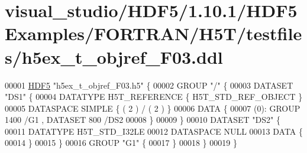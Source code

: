 \hypertarget{visual__studio_2_h_d_f5_21_810_81_2_h_d_f5_examples_2_f_o_r_t_r_a_n_2_h5_t_2testfiles_2h5ex__t__objref___f03_8ddl_source}{}\section{visual\+\_\+studio/\+H\+D\+F5/1.10.1/\+H\+D\+F5\+Examples/\+F\+O\+R\+T\+R\+A\+N/\+H5\+T/testfiles/h5ex\+\_\+t\+\_\+objref\+\_\+\+F03.ddl}
\label{visual__studio_2_h_d_f5_21_810_81_2_h_d_f5_examples_2_f_o_r_t_r_a_n_2_h5_t_2testfiles_2h5ex__t__objref___f03_8ddl_source}

\begin{DoxyCode}
00001 \hyperlink{namespace_h_d_f5}{HDF5} \textcolor{stringliteral}{"h5ex\_t\_objref\_F03.h5"} \{
00002 GROUP \textcolor{stringliteral}{"/"} \{
00003    DATASET \textcolor{stringliteral}{"DS1"} \{
00004       DATATYPE  H5T\_REFERENCE \{ H5T\_STD\_REF\_OBJECT \}
00005       DATASPACE  SIMPLE \{ ( 2 ) / ( 2 ) \}
00006       DATA \{
00007       (0): GROUP 1400 /G1 , DATASET 800 /DS2 
00008       \}
00009    \}
00010    DATASET \textcolor{stringliteral}{"DS2"} \{
00011       DATATYPE  H5T\_STD\_I32LE
00012       DATASPACE  NULL
00013       DATA \{
00014       \}
00015    \}
00016    GROUP \textcolor{stringliteral}{"G1"} \{
00017    \}
00018 \}
00019 \}
\end{DoxyCode}
